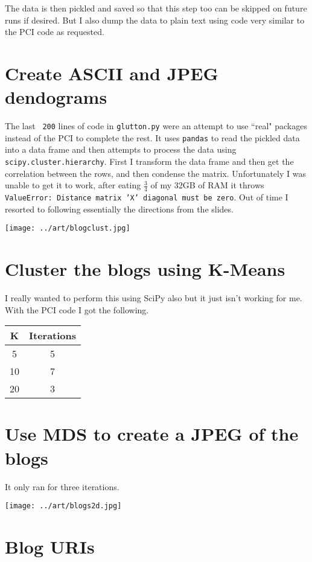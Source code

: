 \documentclass[12pt, a4paper]{article}
\newcommand{\code}[1]{\texttt{#1}}
\begin{document}
The data is then pickled and saved so that this step too can be skipped on future runs if desired. But I also dump the data to plain text using code very similar to the PCI code as requested.

\newpage
\section{Create ASCII and JPEG dendograms}

The last \code{~200} lines of code in \code{glutton.py} were an attempt to use ``real" packages instead of the PCI to complete the rest. It uses \code{pandas} to read the pickled data into a data frame and then attempts to process the data using \code{scipy.cluster.hierarchy}. First I transform the data frame and then get the correlation between the rows, and then condense the matrix. Unfortunately I was unable to get it to work, after eating $\tfrac{3}{4}$ of my 32GB of RAM it throws \code{ValueError: Distance matrix 'X' diagonal must be zero}. Out of time I resorted to following essentially the directions from the slides.

\texttt{[image: ../art/blogclust.jpg]}

\section{Cluster the blogs using K-Means}

I really wanted to perform this using SciPy also but it just isn't working for me. With the PCI code I got the following.

\begin{table}[h]
\centering
\begin{tabular}{|c|c|}
\hline
\textbf{K} & \textbf{Iterations} \\ \hline
5          & 5                   \\ \hline
10         & 7                   \\ \hline
20         & 3                   \\ \hline
\end{tabular}
\end{table}

\newpage
\section{Use MDS to create a JPEG of the blogs}

It only ran for three iterations.

\texttt{[image: ../art/blogs2d.jpg]}

\newpage
\section{Blog URIs}


\end{document}
